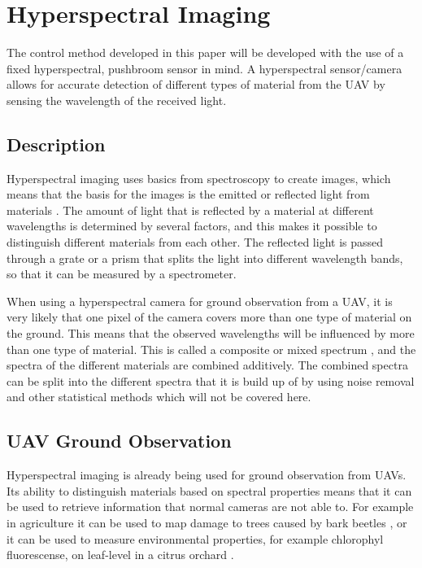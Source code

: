 \section{Hyperspectral Imaging}

The control method developed in this paper will be developed with the use of a fixed hyperspectral, pushbroom sensor in mind. A hyperspectral sensor/camera allows for accurate detection of different types of material from the UAV by sensing the wavelength of the received light.


\subsection{Description}

Hyperspectral imaging uses basics from spectroscopy to create images, which means that the basis for the images is the emitted or reflected light from materials \cite{hypSMITH}. The amount of light that is reflected by a material at different wavelengths is determined by several factors, and this makes it possible to distinguish different materials from each other. The reflected light is passed through a grate or a prism that splits the light into different wavelength bands, so that it can be measured by a spectrometer.

When using a hyperspectral camera for ground observation from a UAV, it is very likely that one pixel of the camera covers more than one type of material on the ground. This means that the observed wavelengths will be influenced by more than one type of material. This is called a composite or mixed spectrum \cite{hypSMITH}, and the spectra of the different materials are combined additively. The combined spectra can be split into the different spectra that it is build up of by using noise removal and other statistical methods which will not be covered here.


\subsection{UAV Ground Observation}

Hyperspectral imaging is already being used for ground observation from UAVs. Its ability to distinguish materials based on spectral properties means that it can be used to retrieve information that normal cameras are not able to. For example in agriculture it can be used to map damage to trees caused by bark beetles \cite{beetleNASI}, or it can be used to measure environmental properties, for example chlorophyl fluorescense, on leaf-level in a citrus orchard \cite{waterStressBERNI}.

